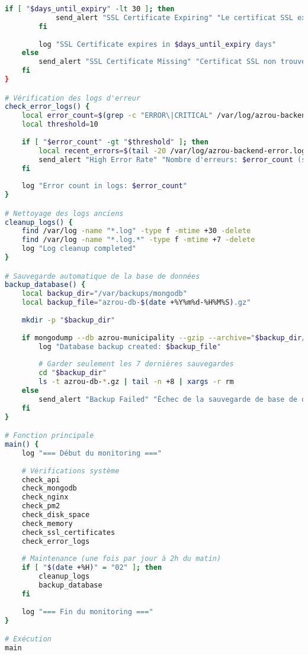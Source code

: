\begin{lstlisting}[language=bash, caption=monitor.sh - Monitoring complet du système]
        if [ "$days_until_expiry" -lt 30 ]; then
            send_alert "SSL Certificate Expiring" "Le certificat SSL expire dans $days_until_expiry jours"
        fi
        
        log "SSL Certificate expires in $days_until_expiry days"
    else
        send_alert "SSL Certificate Missing" "Certificat SSL non trouvé: $cert_file"
    fi
}

# Vérification des logs d'erreur
check_error_logs() {
    local error_count=$(grep -c "ERROR\|CRITICAL" /var/log/azrou-backend-error.log 2>/dev/null || echo 0)
    local threshold=10
    
    if [ "$error_count" -gt "$threshold" ]; then
        local recent_errors=$(tail -20 /var/log/azrou-backend-error.log)
        send_alert "High Error Rate" "Nombre d'erreurs: $error_count (seuil: $threshold)\n\nErreurs récentes:\n$recent_errors"
    fi
    
    log "Error count in logs: $error_count"
}

# Nettoyage des logs anciens
cleanup_logs() {
    find /var/log -name "*.log" -type f -mtime +30 -delete
    find /var/log -name "*.log.*" -type f -mtime +7 -delete
    log "Log cleanup completed"
}

# Sauvegarde automatique de la base de données
backup_database() {
    local backup_dir="/var/backups/mongodb"
    local backup_file="azrou-db-$(date +%Y%m%d-%H%M%S).gz"
    
    mkdir -p "$backup_dir"
    
    if mongodump --db azrou-municipality --gzip --archive="$backup_dir/$backup_file" > /dev/null 2>&1; then
        log "Database backup created: $backup_file"
        
        # Garder seulement les 7 dernières sauvegardes
        cd "$backup_dir"
        ls -t azrou-db-*.gz | tail -n +8 | xargs -r rm
    else
        send_alert "Backup Failed" "Échec de la sauvegarde de base de données"
    fi
}

# Fonction principale
main() {
    log "=== Début du monitoring ==="
    
    # Vérifications système
    check_api
    check_mongodb
    check_nginx
    check_pm2
    check_disk_space
    check_memory
    check_ssl_certificates
    check_error_logs
    
    # Maintenance (une fois par jour à 2h du matin)
    if [ "$(date +%H)" = "02" ]; then
        cleanup_logs
        backup_database
    fi
    
    log "=== Fin du monitoring ==="
}

# Exécution
main
\end{lstlisting}

